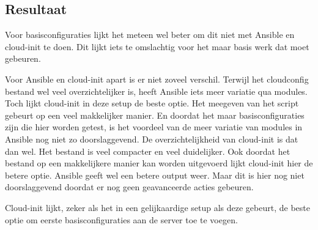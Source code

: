 \subsection{Resultaat}
Voor basisconfiguraties lijkt het meteen wel beter om dit niet met Ansible en cloud-init te doen. Dit lijkt iets te omslachtig voor het maar basis werk dat moet gebeuren. 

Voor Ansible en cloud-init apart is er niet zoveel verschil. Terwijl het cloudconfig bestand wel veel overzichtelijker is, heeft Ansible iets meer variatie qua modules. Toch lijkt cloud-init in deze setup de beste optie. Het meegeven van het script gebeurt op een veel makkelijker manier. En doordat het maar basisconfiguraties zijn die hier worden getest, is het voordeel van de meer variatie van modules in Ansible nog niet zo doorslaggevend. De overzichtelijkheid van cloud-init is dat dan wel. Het bestand is veel compacter en veel duidelijker. Ook doordat het bestand op een makkelijkere manier kan worden uitgevoerd lijkt cloud-init hier de betere optie. Ansible geeft wel een betere output weer. Maar dit is hier nog niet doorslaggevend doordat er nog geen geavanceerde acties gebeuren.

Cloud-init lijkt, zeker als het in een gelijkaardige setup als deze gebeurt, de beste optie om eerste basisconfiguraties aan de server toe te voegen.
